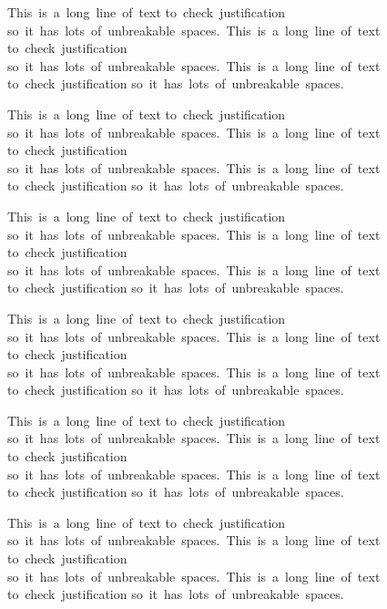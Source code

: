 \documentclass{article}
\newcommand{\longline}{This~is~a~long~line~of~text to~check~justification so~it~has~lots~of~unbreakable~spaces.}
\begin{document}
\begin{flushleft}
\longline\ \longline\ \longline

\longline\ \longline\ \longline
\end{flushleft}

\begin{center}
\longline\ \longline\ \longline

\longline\ \longline\ \longline
\end{center}

\begin{flushright}
\longline\ \longline\ \longline

\longline\ \longline\ \longline
\end{flushright}
\end{document}

